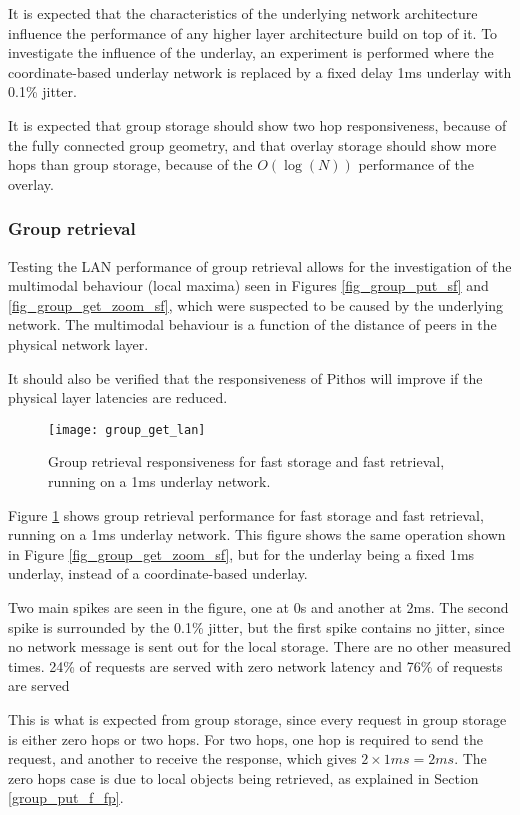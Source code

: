 It is expected that the characteristics of the underlying network architecture influence the performance of any higher layer architecture build on top of it. To investigate the influence of the underlay, an experiment is performed where the coordinate-based underlay network is replaced by a fixed delay 1ms underlay with 0.1\% jitter.

It is expected that group storage should show two hop responsiveness, because of the fully connected group geometry, and that overlay storage should show more hops than group storage, because of the $O(\log(N))$ performance of the overlay.

\subsubsection{Group retrieval}

Testing the LAN performance of group retrieval allows for the investigation of the multimodal behaviour (local maxima) seen in Figures \ref{fig_group_put_sf} and \ref{fig_group_get_zoom_sf}, which were suspected to be caused by the underlying network. The multimodal behaviour is a function of the distance of peers in the physical network layer.

It should also be verified that the responsiveness of Pithos will improve if the physical layer latencies are reduced.

\begin{figure}[htbp]
 \centering
 \texttt{[image: group\_get\_lan]}
 \caption{Group retrieval responsiveness for fast storage and fast retrieval, running on a 1ms underlay network.}
 \label{fig_group_get_lan}
\end{figure}
%
Figure \ref{fig_group_get_lan} shows group retrieval performance for fast storage and fast retrieval, running on a 1ms underlay network. This figure shows the same operation shown in Figure \ref{fig_group_get_zoom_sf}, but for the underlay being a fixed 1ms underlay, instead of a coordinate-based underlay.

Two main spikes are seen in the figure, one at 0s and another at 2ms. The second spike is surrounded by the 0.1\% jitter, but the first spike contains no jitter, since no network message is sent out for the local storage. There are no other measured times. 24\% of requests are served with zero network latency and 76\% of requests are served

This is what is expected from group storage, since every request in group storage is either zero hops or two hops. For two hops, one hop is required to send the request, and another to receive the response, which gives $2\times 1 ms = 2 ms$. The zero hops case is due to local objects being retrieved, as explained in Section \ref{group_put_f_fp}.

